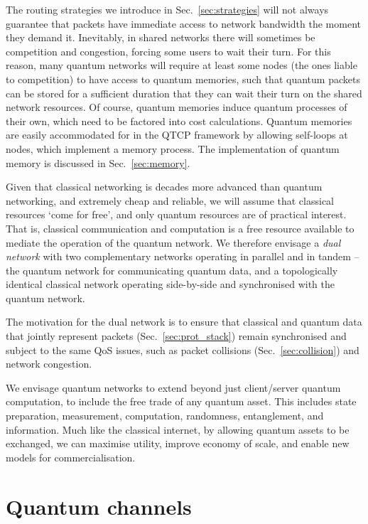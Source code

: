 \documentclass[aps,rmp,twocolumn,amsmath,amssymb,nofootinbib,superscriptaddress]{revtex4}
\begin{document}
The routing strategies we introduce in Sec.~\ref{sec:strategies} will not always guarantee that packets have immediate access to network bandwidth the moment they demand it. Inevitably, in shared networks there will sometimes be competition and congestion, forcing some users to wait their turn. For this reason, many quantum networks will require at least some nodes (the ones liable to competition) to have access to quantum memories, such that quantum packets can be stored for a sufficient duration that they can wait their turn on the shared network resources. Of course, quantum memories induce quantum processes of their own, which need to be factored into cost calculations. Quantum memories are easily accommodated for in the QTCP framework by allowing self-loops at nodes, which implement a memory process. The implementation of quantum memory is discussed in Sec.~\ref{sec:memory}.

Given that classical networking is decades more advanced than quantum networking, and extremely cheap and reliable, we will assume that classical resources `come for free', and only quantum resources are of practical interest. That is, classical communication and computation is a free resource available to mediate the operation of the quantum network. We therefore envisage a \emph{dual network} with two complementary networks operating in parallel and in tandem -- the quantum network for communicating quantum data, and a topologically identical classical network operating side-by-side and synchronised with the quantum network.

The motivation for the dual network is to ensure that classical and quantum data that jointly represent packets (Sec.~\ref{sec:prot_stack}) remain synchronised and subject to the same QoS issues, such as packet collisions (Sec.~\ref{sec:collision}) and network congestion.

We envisage quantum networks to extend beyond just client/server quantum computation, to include the free trade of any quantum asset. This includes state preparation, measurement, computation, randomness, entanglement, and information. Much like the classical internet, by allowing quantum assets to be exchanged, we can maximise utility, improve economy of scale, and enable new models for commercialisation.

%
%

\section{Quantum channels} \label{sec:quant_chan}
\end{document}

